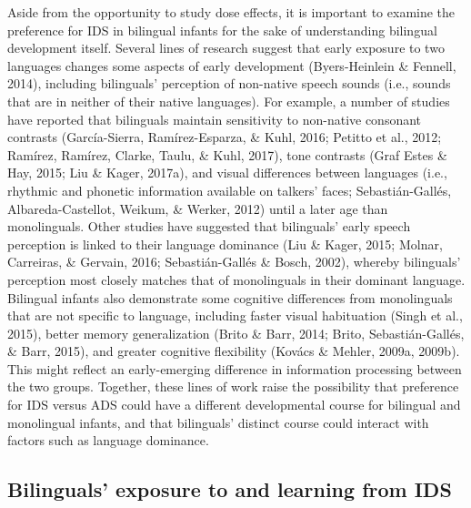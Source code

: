 \documentclass[
  english,
  ,man,floatsintext]{apa6}
\begin{document}
Aside from the opportunity to study dose effects, it is important to examine the preference for IDS in bilingual infants for the sake of understanding bilingual development itself. Several lines of research suggest that early exposure to two languages changes some aspects of early development (Byers-Heinlein \& Fennell, 2014), including bilinguals' perception of non-native speech sounds (i.e., sounds that are in neither of their native languages). For example, a number of studies have reported that bilinguals maintain sensitivity to non-native consonant contrasts (García-Sierra, Ramírez-Esparza, \& Kuhl, 2016; Petitto et al., 2012; Ramírez, Ramírez, Clarke, Taulu, \& Kuhl, 2017), tone contrasts (Graf Estes \& Hay, 2015; Liu \& Kager, 2017a), and visual differences between languages (i.e., rhythmic and phonetic information available on talkers' faces; Sebastián-Gallés, Albareda-Castellot, Weikum, \& Werker, 2012) until a later age than monolinguals. Other studies have suggested that bilinguals' early speech perception is linked to their language dominance (Liu \& Kager, 2015; Molnar, Carreiras, \& Gervain, 2016; Sebastián-Gallés \& Bosch, 2002), whereby bilinguals' perception most closely matches that of monolinguals in their dominant language. Bilingual infants also demonstrate some cognitive differences from monolinguals that are not specific to language, including faster visual habituation (Singh et al., 2015), better memory generalization (Brito \& Barr, 2014; Brito, Sebastián-Gallés, \& Barr, 2015), and greater cognitive flexibility (Kovács \& Mehler, 2009a, 2009b). This might reflect an early-emerging difference in information processing between the two groups. Together, these lines of work raise the possibility that preference for IDS versus ADS could have a different developmental course for bilingual and monolingual infants, and that bilinguals' distinct course could interact with factors such as language dominance.

\hypertarget{bilinguals-exposure-to-and-learning-from-ids}{%
\subsection{Bilinguals' exposure to and learning from IDS}\label{bilinguals-exposure-to-and-learning-from-ids}}
\end{document}
